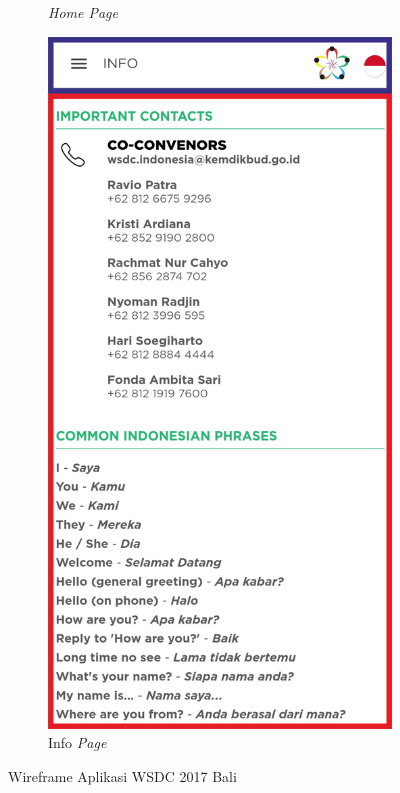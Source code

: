 \begin{figure}[H]
\begin{subfigure}[b]{0.24\textwidth}
	    \caption{{\it Home Page}}
	    \label{fig:homePageWireframe}
     \end{subfigure}
	\begin{subfigure}[b]{0.24\textwidth}
    \centering
	    \includegraphics[scale=0.37]{Gambar/InfoPageWireframe.png}
	    \caption{Info \textit{Page}}
	    \label{fig:InfoPageWireframe}
     \end{subfigure}
	\caption{Wireframe Aplikasi WSDC 2017 Bali}
        \label{fig:three graphs}
\end{figure}

